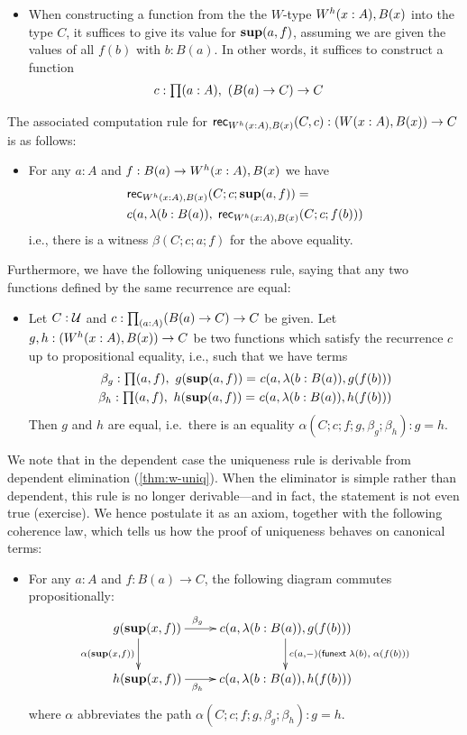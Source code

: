 \begin{itemize}
\item When constructing a function from the the $W$-type $W^h(x:A), B(x)$ into the type $C$, it suffices to give its value for $\mathbf{sup}(a,f)$, assuming we are given the values of all $f(b)$ with $b : B(a)$.
In other words, it suffices to construct a function
\begin{align*}
c : & \; \prd{a:A} (B(a) \to C) \to C
\end{align*}
\end{itemize}
The associated computation rule for $\mathsf{rec}_{W^h(x:A), B(x)}(C,c) : (W(x:A), B(x)) \to C$ is as follows:
\begin{itemize}
\item For any $a : A$ and $f : B(a) \to W^h(x:A), B(x)$ we have 
\begin{align*}
& \mathsf{rec}_{W^h(x:A), B(x)}(C;c;\mathbf{sup}(a,f)) = \\ & c(a,\lambda (b : B(a)), \; \mathsf{rec}_{W^h(x:A), B(x)}(C;c;f(b)))
\end{align*}
i.e., there is a witness $\beta(C;c;a;f)$ for the above equality.
\end{itemize}

Furthermore, we have the following uniqueness rule, saying that any two functions defined by the same recurrence are equal:
\begin{itemize}
\item Let $C : \mathcal{U}$ and $c : \prd{a:A} (B(a) \to C) \to C$ be given. Let $g,h : (W^h(x:A), B(x)) \to C$ be two functions which satisfy the recurrence $c$ up to propositional equality, i.e., such that we have terms
\begin{align*}
\beta_g : \prd{a,f} \id{g(\supp(a,f))}{c(a,\lambda (b: B(a)), g(f(b)))} \\
\beta_h : \prd{a,f} \id{h(\supp(a,f))}{c(a,\lambda (b: B(a)), h(f(b)))}
\end{align*}
Then $g$ and $h$ are equal, i.e.\ there is an equality $\alpha(C;c;f;g,\beta_g;\beta_h) : g = h$.
\end{itemize}

We note that in the dependent case the uniqueness rule is derivable from dependent elimination (\autoref{thm:w-uniq}). When the eliminator is simple rather than dependent, this rule is no longer derivable---and in fact, the statement is not even true (exercise). We hence postulate it as an axiom, together with the following coherence law, which tells us how the proof of uniqueness behaves on canonical terms:
\begin{itemize}
\item
For any $a : A$ and $f : B(a) \to C$, the following diagram commutes propositionally:
\[\xymatrix{
\;\;\;\;\; g(\supp(x,f)) \ar_{\alpha(\supp(x,f))}[d] \ar^{\beta_g \;\;\;\;\;\;\;\;\;\;}[r] & c(a,\lambda (b: B(a)), g(f(b)))
\ar^{c(a,-)(\funext \; \lambda (b), \; \alpha(f(b)))}[d] \\
\;\;\;\;\; h(\supp(x,f)) \ar_{\beta_h \;\;\;\;\;\;\;\;\;\;}[r] & c(a,\lambda (b: B(a)), h(f(b))) \\
}\]
where $\alpha$ abbreviates the path $\alpha(C;c;f;g,\beta_g;\beta_h) : g = h$.
\end{itemize}

